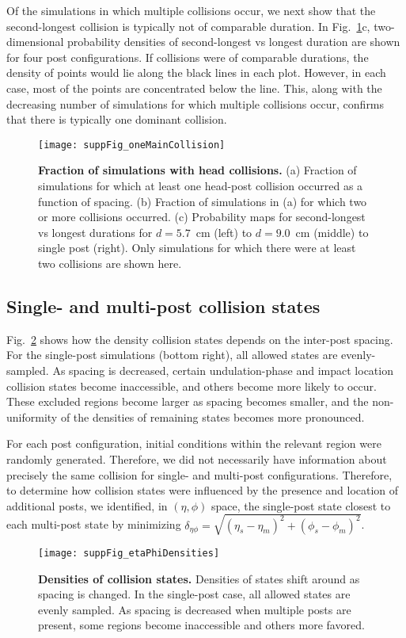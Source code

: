 \documentclass[aps,pre,twocolumn,superscriptaddress]{revtex4-1}
\begin{document}
Of the simulations in which multiple collisions occur, we next show that the second-longest collision is typically not of comparable duration. In Fig.~\ref{fig:hit}c, two-dimensional probability densities of second-longest vs longest duration are shown for four post configurations.  If collisions were of comparable durations, the density of points would lie along the black lines in each plot. However, in each case, most of the points are concentrated below the line. This, along with the decreasing number of simulations for which multiple collisions occur, confirms that there is typically one dominant collision.
\begin{figure}[h!]
	\texttt{[image: suppFig\_oneMainCollision]}
	\caption{\textbf{Fraction of simulations with head collisions.} (a) Fraction of simulations for which at least one head-post collision occurred as a function of spacing. (b) Fraction of simulations in (a) for which two or more collisions occurred. (c) Probability maps for second-longest vs longest durations for $d = 5.7$~cm  (left) to $d = 9.0$~cm (middle) to single post (right). Only  simulations for which there were at least two collisions are shown here.}
	\label{fig:hit}
\end{figure}


\subsection{Single- and multi-post collision states}
\label{suppmat:stateDistances}

Fig.~\ref{fig:densities} shows how the density collision states depends on the inter-post spacing.  For the single-post simulations (bottom right), all allowed states are evenly-sampled.  As spacing is decreased, certain undulation-phase and impact location collision states become inaccessible, and others become more likely to occur.  These excluded regions become larger as spacing becomes smaller, and the non-uniformity of the densities of remaining states becomes more pronounced.

For each post configuration, initial conditions within the relevant region were randomly generated. Therefore, we did not necessarily have information about precisely the same collision for single- and multi-post configurations. Therefore, to determine how collision states were influenced by the presence and location of additional posts, we identified, in $(\eta,\phi)$ space, the single-post state closest to each multi-post state by minimizing $\delta_{\eta\phi} = \sqrt{(\eta_s-\eta_m)^2+(\phi_s-\phi_m)^2}$. 
\begin{figure}[h!]
	\texttt{[image: suppFig\_etaPhiDensities]}
	\caption{\textbf{Densities of collision states.} Densities of states shift around as spacing is changed. In the single-post case, all allowed states are evenly sampled.  As spacing is decreased when multiple posts are present, some regions become inaccessible and others more favored.}
	\label{fig:densities}
\end{figure}
\end{document}
